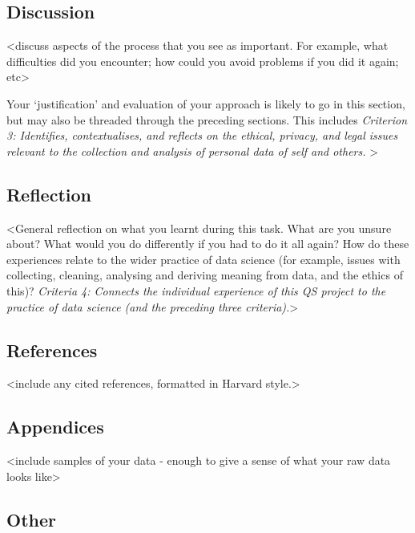 \documentclass[
]{article}
\begin{document}
\hypertarget{discussion}{%
\subsection{Discussion}\label{discussion}}

\textless discuss aspects of the process that you see as important. For
example, what difficulties did you encounter; how could you avoid
problems if you did it again; etc\textgreater{}

Your `justification' and evaluation of your approach is likely to go in
this section, but may also be threaded through the preceding sections.
This includes \emph{Criterion 3: Identifies, contextualises, and
reflects on the ethical, privacy, and legal issues relevant to the
collection and analysis of personal data of self and others.}
\textgreater{}

\hypertarget{reflection}{%
\subsection{Reflection}\label{reflection}}

\textless General reflection on what you learnt during this task. What
are you unsure about? What would you do differently if you had to do it
all again? How do these experiences relate to the wider practice of data
science (for example, issues with collecting, cleaning, analysing and
deriving meaning from data, and the ethics of this)? \emph{Criteria 4:
Connects the individual experience of this QS project to the practice of
data science (and the preceding three criteria).}\textgreater{}

\hypertarget{references}{%
\subsection{References}\label{references}}

\textless include any cited references, formatted in Harvard
style.\textgreater{}

\hypertarget{appendices}{%
\subsection{Appendices}\label{appendices}}

\textless include samples of your data - enough to give a sense of what
your raw data looks like\textgreater{}

\hypertarget{other}{%
\subsection{Other}\label{other}}
\end{document}
